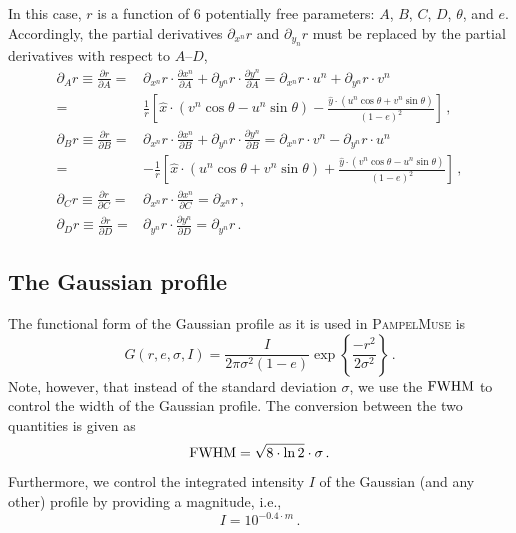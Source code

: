 %
In this case, $r$ is a function of $6$ potentially free parameters: $A$, $B$, $C$, $D$, $\theta$, and $e$. Accordingly, the partial derivatives $\partial_{x^n}r$ and $\partial_{y_n}r$ must be replaced by the partial derivatives with respect to $A$--$D$,
%
\begin{align}
 \partial_{A} r \equiv \frac{\partial r}{\partial A} =& \partial_{x^n} r \cdot\frac{\partial x^n}{\partial A} + \partial_{y^n} r \cdot\frac{\partial y^n}{\partial A} = \partial_{x^n} r \cdot u^n + \partial_{y^n} r \cdot v^n \nonumber \\
 =& \frac{1}{r}\left[ {\hat x}\cdot(v^n\cos\theta-u^n\sin\theta) - \frac{{\hat y}\cdot(u^n\cos\theta + v^n\sin\theta)}{(1-e)^2} \right]\,,\\
 \partial_{B} r \equiv \frac{\partial r}{\partial B} =& \partial_{x^n} r \cdot\frac{\partial x^n}{\partial B} + \partial_{y^n} r \cdot\frac{\partial y^n}{\partial B} = \partial_{x^n} r \cdot v^n - \partial_{y^n} r \cdot u^n \nonumber \\
 =& -\frac{1}{r}\left[ {\hat x}\cdot(u^n\cos\theta+v^n\sin\theta) + \frac{{\hat y}\cdot(v^n\cos\theta - u^n\sin\theta)}{(1-e)^2} \right]\,,\\
 \partial_{C} r \equiv \frac{\partial r}{\partial C} =& \partial_{x^n} r \cdot\frac{\partial x^n}{\partial C}  = \partial_{x^n} r\,,\\
  \partial_{D} r \equiv \frac{\partial r}{\partial D} =& \partial_{y^n} r \cdot\frac{\partial y^n}{\partial D}  = \partial_{y^n} r\,.
\end{align}

\subsection{The Gaussian profile}
\label{sec:gauss}

The functional form of the Gaussian profile as it is used in \textsc{PampelMuse} is
%
\begin{equation}
 G(r, e, \sigma, I) = \frac{I}{2\pi\sigma^2(1-e)}\exp\left\{\frac{-r^2}{2\sigma^2}\right\}\,.
\end{equation}
%
Note, however, that instead of the standard deviation $\sigma$, we use the $\text{FWHM}$ to control the width of the Gaussian profile. The conversion between the two quantities is given as
%
\begin{equation}
 \text{FWHM} = \sqrt{8\cdot \ln 2}\cdot\sigma\,.
\end{equation}
%
Furthermore, we control the integrated intensity $I$ of the Gaussian (and any other) profile by providing a magnitude, i.e.,
%
\begin{equation} \label{eq:intensity}
 I = 10^{-0.4\cdot m}\,.  
\end{equation}

